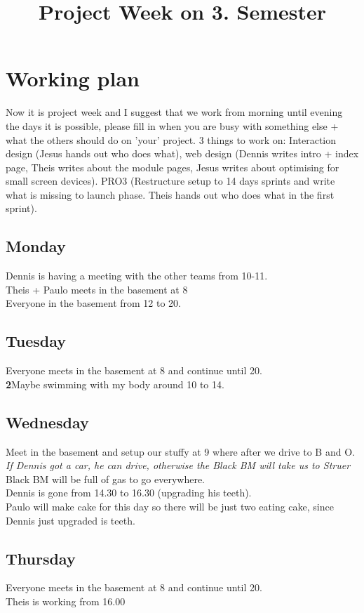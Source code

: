 \documentclass[10pt,a4paper]{article}
\title{Project Week on 3. Semester}
\begin{document}
\maketitle
\section{Working plan}
Now it is project week and I suggest that we work from morning until evening the days it is possible, please fill in when you are busy with something else + what the others should do on 'your' project.
3 things to work on: Interaction design (Jesus hands out who does what), web design (Dennis writes intro + index page, Theis writes about the module pages, Jesus writes about optimising for small screen devices). PRO3 (Restructure setup to 14 days sprints and write what is missing to launch phase. Theis hands out who does what in the first sprint).
\subsection{Monday}
Dennis is having a meeting with the other teams from 10-11.
\\Theis + Paulo meets in the basement at 8
\\Everyone in the basement from 12 to 20.
\subsection{Tuesday}
Everyone meets in the basement at 8 and continue until 20.
\\\textbf2{Maybe} swimming with my body around 10 to 14.
\subsection{Wednesday}
Meet in the basement and setup our stuffy at 9 where after we drive to B and O.
\\ \textit{If Dennis got a car, he can drive, otherwise the Black BM will take us to Struer}
\\ Black BM will be full of gas to go everywhere.
\\ Dennis is gone from 14.30 to 16.30 (upgrading his teeth).
\\ Paulo will make cake for this day so there will be just two eating cake, since Dennis just upgraded is teeth.
\subsection{Thursday}
Everyone meets in the basement at 8 and continue until 20.
\\ Theis is working from 16.00
\end{document}

